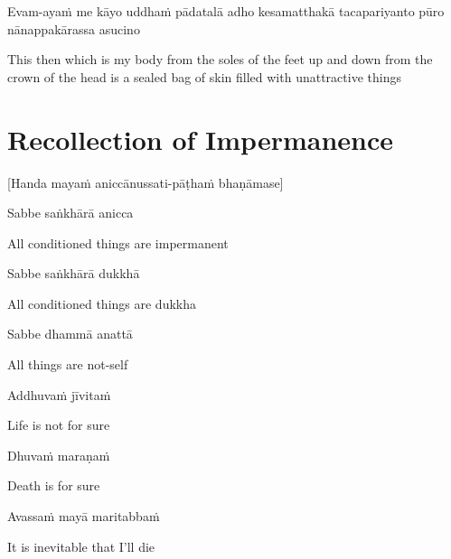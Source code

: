 Evam-ayaṁ me kāyo uddhaṁ pādatalā adho kesamatthakā tacapariyanto pūro nānappakārassa asucino

\begin{english}
  This then which is my body from the soles of the feet up and down from the crown of the head is a sealed bag of skin filled with unattractive things
\end{english}

\suttaRef{[DN 22]}

\clearpage

\section{Recollection of Impermanence}
\label{recollection-impermanence}

\begin{center}
  [Handa mayaṁ aniccānussati-pāṭhaṁ bhaṇāmase]
\end{center}

Sabbe saṅkhārā anicca

\begin{english}
  All conditioned things are impermanent
\end{english}

Sabbe saṅkhārā dukkhā

\begin{english}
  All conditioned things are dukkha
\end{english}

Sabbe dhammā anattā

\begin{english}
  All things are not-self
\end{english}

\suttaRef{[Dhp 277-279]}

Addhuvaṁ jīvitaṁ

\begin{english}
  Life is not for sure
\end{english}

Dhuvaṁ maraṇaṁ

\begin{english}
  Death is for sure
\end{english}

Avassaṁ mayā maritabbaṁ

\begin{english}
  It is inevitable that I’ll die
\end{english}

